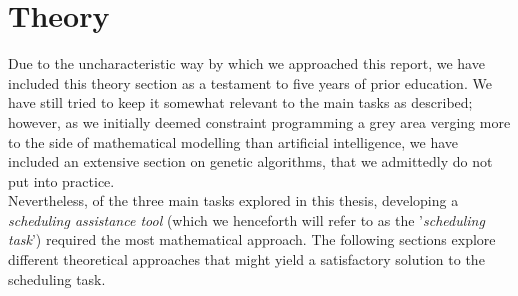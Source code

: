 \section{Theory}\label{sec:theory}
Due to the uncharacteristic way by which we approached this report, we have included this theory section as a testament to five years of prior education. We have still tried to keep it somewhat relevant to the main tasks as described; however, as we initially deemed constraint programming a grey area verging more to the side of mathematical modelling than artificial intelligence, we have included an extensive section on genetic algorithms, that we admittedly do not put into practice.
\\
Nevertheless, of the three main tasks explored in this thesis, developing a \emph{scheduling assistance tool} (which we henceforth will refer to as the '\emph{scheduling task}') required the most mathematical approach. 
The following sections explore different theoretical approaches that might yield a satisfactory solution to the scheduling task.




